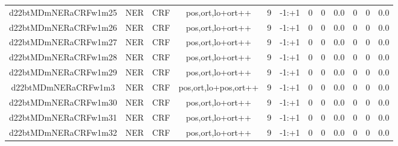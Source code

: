 \documentclass[a4paper]{article}
\begin{document}
\begin{landscape}
\begin{center}
\begin{tabular}{ |c|c|c|c|c|c|c|c|c|c|c|c|}
 
 	
 	\small{ d22btMDmNERaCRFw1m25 } & \small{ NER} & \small{  CRF }  & pos,ort,lo+ort++  &  9 &  \small{  -1:+1 }  &  0 & 0 & 0.0  &  0 & 0 & 0.0 \\
 	

 
 	
 	\small{ d22btMDmNERaCRFw1m26 } & \small{ NER} & \small{  CRF }  & pos,ort,lo+ort++  &  9 &  \small{  -1:+1 }  &  0 & 0 & 0.0  &  0 & 0 & 0.0 \\
 	

 
 	
 	\small{ d22btMDmNERaCRFw1m27 } & \small{ NER} & \small{  CRF }  & pos,ort,lo+ort++  &  9 &  \small{  -1:+1 }  &  0 & 0 & 0.0  &  0 & 0 & 0.0 \\
 	

 
 	
 	\small{ d22btMDmNERaCRFw1m28 } & \small{ NER} & \small{  CRF }  & pos,ort,lo+ort++  &  9 &  \small{  -1:+1 }  &  0 & 0 & 0.0  &  0 & 0 & 0.0 \\
 	

 
 	
 	\small{ d22btMDmNERaCRFw1m29 } & \small{ NER} & \small{  CRF }  & pos,ort,lo+ort++  &  9 &  \small{  -1:+1 }  &  0 & 0 & 0.0  &  0 & 0 & 0.0 \\
 	

 
 	
 	\small{ d22btMDmNERaCRFw1m3 } & \small{ NER} & \small{  CRF }  & pos,ort,lo+pos,ort++  &  9 &  \small{  -1:+1 }  &  0 & 0 & 0.0  &  0 & 0 & 0.0 \\
 	

 
 	
 	\small{ d22btMDmNERaCRFw1m30 } & \small{ NER} & \small{  CRF }  & pos,ort,lo+ort++  &  9 &  \small{  -1:+1 }  &  0 & 0 & 0.0  &  0 & 0 & 0.0 \\
 	

 
 	
 	\small{ d22btMDmNERaCRFw1m31 } & \small{ NER} & \small{  CRF }  & pos,ort,lo+ort++  &  9 &  \small{  -1:+1 }  &  0 & 0 & 0.0  &  0 & 0 & 0.0 \\
 	

 
 	
 	\small{ d22btMDmNERaCRFw1m32 } & \small{ NER} & \small{  CRF }  & pos,ort,lo+ort++  &  9 &  \small{  -1:+1 }  &  0 & 0 & 0.0  &  0 & 0 & 0.0 \\
 	
 \hline
\end{tabular}
\end{center}





\end{landscape}
\end{document}
